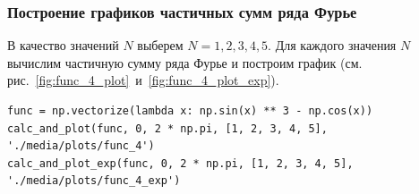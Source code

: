 \subsubsection{Построение графиков частичных сумм ряда Фурье}
В качество значений $N$ выберем $N = 1, 2, 3, 4, 5$. Для каждого значения $N$ вычислим частичную сумму ряда Фурье и построим график (см. рис.~\ref{fig:func_4_plot}~и~\ref{fig:func_4_plot_exp}).

\begin{lstlisting}[style=python_white, caption=Построение графиков частичных сумм ряда Фурье, label=lst:func_1_plot]
func = np.vectorize(lambda x: np.sin(x) ** 3 - np.cos(x))
calc_and_plot(func, 0, 2 * np.pi, [1, 2, 3, 4, 5], './media/plots/func_4')
calc_and_plot_exp(func, 0, 2 * np.pi, [1, 2, 3, 4, 5], './media/plots/func_4_exp')
\end{lstlisting}

